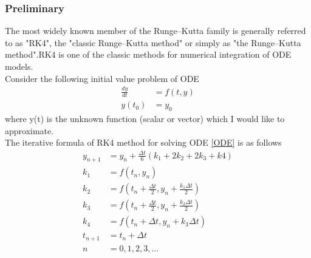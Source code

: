 \documentclass[a4paper]{article}
\begin{document}
        \subsubsection{Preliminary}
        The most widely known member of the Runge–Kutta family is generally referred to as "RK4", the "classic Runge–Kutta method" or simply as "the Runge–Kutta method".RK4 is one of the classic methods for numerical integration of ODE models. \\
        Consider the following initial value problem of ODE 
        \begin{equation}\label{ODE}
            \begin{split}
                \frac{dy}{dt} & = f(t,y) \\ 
                 y(t_0) & = y_0
            \end{split}
        \end{equation}
        where y(t) is the unknown function (scalar or vector) which I would like to approximate.\\
        The iterative formula of RK4 method for solving ODE \eqref{ODE} is as follows
        \begin{equation}\label{RK4}
            \begin{split}
                y_{n+1} & = y_n + \frac{\Delta t}{6}(k_1 + 2k_2 + 2k_3 + k4) \\
                k_1 & = f(t_n,y_n) \\
                k_2 & = f(t_n + \frac{\Delta t}{2}, y_n + \frac{k_1 \Delta t}{2}) \\
                k_3 & = f(t_n + \frac{\Delta t}{2}, y_n + \frac{k_2 \Delta t}{2}) \\
                k_4 & = f(t_n + \Delta t, y_n + k_3 \Delta t) \\
                t_{n+1} & = t_n + \Delta t \\
                n & = 0,1,2,3,...
            \end{split}
        \end{equation}
        
\end{document}
